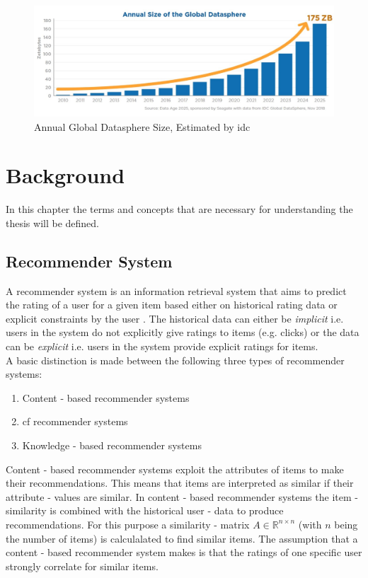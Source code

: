 \begin{figure}[ht]
    \centering
    \includegraphics[width=1\textwidth]{images/annual_datasphere_growth.jpg}
    \caption{Annual Global Datasphere Size, Estimated by \acrshort{idc}}
    \label{fig:datasphere_growth}
\end{figure}

\section{Background}
In this chapter the terms and concepts that are necessary for understanding the thesis will be defined. 

\subsection{Recommender System}
\label{subsec:rec_sys}
A recommender system is an information retrieval system that aims to predict the rating of a user for a given item based either on historical rating data or explicit constraints by the user \cite{aggarwal2016recommender}.
The historical data can either be \textit{implicit} i.e. users in the system do not explicitly give ratings to items (e.g. clicks) or the data
can be \textit{explicit} i.e. users in the system provide explicit ratings for items.\\
A basic distinction is made between the following three types of recommender systems:
\begin{enumerate}
    \item Content - based recommender systems 
    \item \acrfull{cf} recommender systems
    \item Knowledge - based recommender systems
\end{enumerate}

\noindent Content - based recommender systems exploit the attributes of items to make their recommendations.
This means that items are interpreted as similar if their attribute - values are similar. 
In content - based recommender systems the item - similarity is combined with the historical user - data to produce recommendations.
For this purpose a similarity - matrix ${A} \in \mathbb{R}^{n \times n}$ (with $n$ being the number of items) is calculalated to find
similar items. The assumption that a content - based recommender system makes is that the ratings of one specific user strongly
correlate for similar items.

